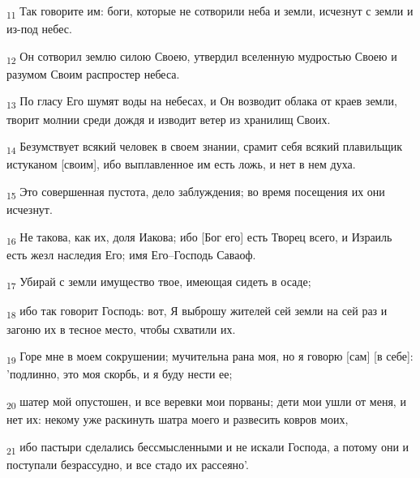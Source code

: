\begin{tcolorbox}
\textsubscript{11} Так говорите им: боги, которые не сотворили неба и земли, исчезнут с земли и из-под небес.
\end{tcolorbox}
\begin{tcolorbox}
\textsubscript{12} Он сотворил землю силою Своею, утвердил вселенную мудростью Своею и разумом Своим распростер небеса.
\end{tcolorbox}
\begin{tcolorbox}
\textsubscript{13} По гласу Его шумят воды на небесах, и Он возводит облака от краев земли, творит молнии среди дождя и изводит ветер из хранилищ Своих.
\end{tcolorbox}
\begin{tcolorbox}
\textsubscript{14} Безумствует всякий человек в своем знании, срамит себя всякий плавильщик истуканом [своим], ибо выплавленное им есть ложь, и нет в нем духа.
\end{tcolorbox}
\begin{tcolorbox}
\textsubscript{15} Это совершенная пустота, дело заблуждения; во время посещения их они исчезнут.
\end{tcolorbox}
\begin{tcolorbox}
\textsubscript{16} Не такова, как их, доля Иакова; ибо [Бог его] есть Творец всего, и Израиль есть жезл наследия Его; имя Его--Господь Саваоф.
\end{tcolorbox}
\begin{tcolorbox}
\textsubscript{17} Убирай с земли имущество твое, имеющая сидеть в осаде;
\end{tcolorbox}
\begin{tcolorbox}
\textsubscript{18} ибо так говорит Господь: вот, Я выброшу жителей сей земли на сей раз и загоню их в тесное место, чтобы схватили их.
\end{tcolorbox}
\begin{tcolorbox}
\textsubscript{19} Горе мне в моем сокрушении; мучительна рана моя, но я говорю [сам] [в себе]: 'подлинно, это моя скорбь, и я буду нести ее;
\end{tcolorbox}
\begin{tcolorbox}
\textsubscript{20} шатер мой опустошен, и все веревки мои порваны; дети мои ушли от меня, и нет их: некому уже раскинуть шатра моего и развесить ковров моих,
\end{tcolorbox}
\begin{tcolorbox}
\textsubscript{21} ибо пастыри сделались бессмысленными и не искали Господа, а потому они и поступали безрассудно, и все стадо их рассеяно'.
\end{tcolorbox}
